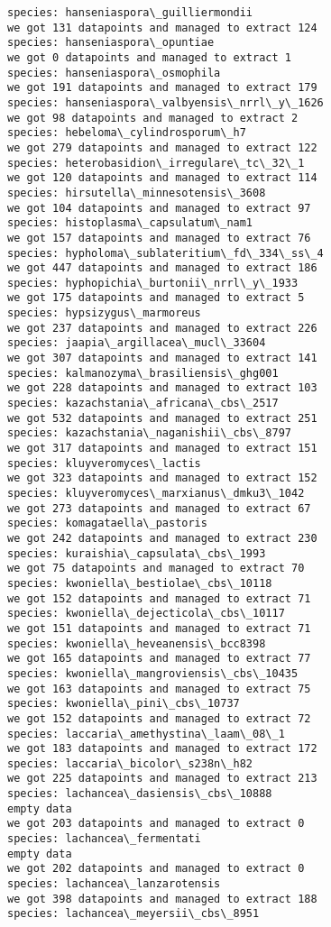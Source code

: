 \documentclass[11pt]{article}
\begin{document}
\begin{Verbatim}[commandchars=\\\{\}]
species: hanseniaspora\_guilliermondii
we got 131 datapoints and managed to extract 124
species: hanseniaspora\_opuntiae
we got 0 datapoints and managed to extract 1
species: hanseniaspora\_osmophila
we got 191 datapoints and managed to extract 179
species: hanseniaspora\_valbyensis\_nrrl\_y\_1626
we got 98 datapoints and managed to extract 2
species: hebeloma\_cylindrosporum\_h7
we got 279 datapoints and managed to extract 122
species: heterobasidion\_irregulare\_tc\_32\_1
we got 120 datapoints and managed to extract 114
species: hirsutella\_minnesotensis\_3608
we got 104 datapoints and managed to extract 97
species: histoplasma\_capsulatum\_nam1
we got 157 datapoints and managed to extract 76
species: hypholoma\_sublateritium\_fd\_334\_ss\_4
we got 447 datapoints and managed to extract 186
species: hyphopichia\_burtonii\_nrrl\_y\_1933
we got 175 datapoints and managed to extract 5
species: hypsizygus\_marmoreus
we got 237 datapoints and managed to extract 226
species: jaapia\_argillacea\_mucl\_33604
we got 307 datapoints and managed to extract 141
species: kalmanozyma\_brasiliensis\_ghg001
we got 228 datapoints and managed to extract 103
species: kazachstania\_africana\_cbs\_2517
we got 532 datapoints and managed to extract 251
species: kazachstania\_naganishii\_cbs\_8797
we got 317 datapoints and managed to extract 151
species: kluyveromyces\_lactis
we got 323 datapoints and managed to extract 152
species: kluyveromyces\_marxianus\_dmku3\_1042
we got 273 datapoints and managed to extract 67
species: komagataella\_pastoris
we got 242 datapoints and managed to extract 230
species: kuraishia\_capsulata\_cbs\_1993
we got 75 datapoints and managed to extract 70
species: kwoniella\_bestiolae\_cbs\_10118
we got 152 datapoints and managed to extract 71
species: kwoniella\_dejecticola\_cbs\_10117
we got 151 datapoints and managed to extract 71
species: kwoniella\_heveanensis\_bcc8398
we got 165 datapoints and managed to extract 77
species: kwoniella\_mangroviensis\_cbs\_10435
we got 163 datapoints and managed to extract 75
species: kwoniella\_pini\_cbs\_10737
we got 152 datapoints and managed to extract 72
species: laccaria\_amethystina\_laam\_08\_1
we got 183 datapoints and managed to extract 172
species: laccaria\_bicolor\_s238n\_h82
we got 225 datapoints and managed to extract 213
species: lachancea\_dasiensis\_cbs\_10888
empty data
we got 203 datapoints and managed to extract 0
species: lachancea\_fermentati
empty data
we got 202 datapoints and managed to extract 0
species: lachancea\_lanzarotensis
we got 398 datapoints and managed to extract 188
species: lachancea\_meyersii\_cbs\_8951

\end{Verbatim}
\end{document}
